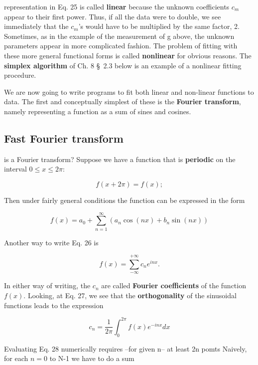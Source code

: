  representation in Eq. 25 is called \textbf{linear} because the unknown coefficients $c_{m}$ appear to their first power. Thus, if all the data were to double, we see immediately that the $c_{m}$'s would have to be multiplied by the same factor, 2. Sometimes, as in the example of the measurement of g above, the unknown parameters appear in more complicated fashion. The problem of fitting with these more general functional forms is called \textbf{nonlinear} for obvious reasons. The \textbf{simplex algorithm} of Ch. 8 \S\ 2.3 below is an example of a nonlinear fitting procedure.

We are now going to write programs to fit both linear and non-linear functions to data. The first and conceptually simplest of these is the \textbf{Fourier transform}, namely representing a function as a sum of sines and cosines.

\subsection{Fast Fourier transform}
 is a Fourier transform? Suppose we have a function that is \textbf{periodic} on the interval $0 \leq x \leq 2\pi$:

\begin{equation}
f(x + 2\pi) = f(x) ;
\end{equation}

Then under fairly general conditions the function can be expressed in the form

\begin{equation}
f(x) = a_{0} + \sum_{n=1}^{\infty} (a_{n} \cos(nx) + b_{n} \sin(nx))
\end{equation}

Another way to write Eq. 26 is

\begin{equation}
f(x) = \sum_{-\infty}^{+\infty} c_{n}e^{inx}.
\end{equation}

In either way of writing, the $c_{n}$ are called \textbf{Fourier coefficients} of the function $f(x)$. Looking, \eg at Eq. 27, we see that the \textbf{orthogonality} of the sinusoidal functions leads to the expression

\begin{equation}
c_{n} = \frac{1}{2\pi}\int_{0}^{2\pi}f(x)e^{-inx}dx
\end{equation}

Evaluating Eq. 28 numerically requires --for given n-- at least 2n pomts Naively, for each $n = 0$ to N-1 we have to do a sum

